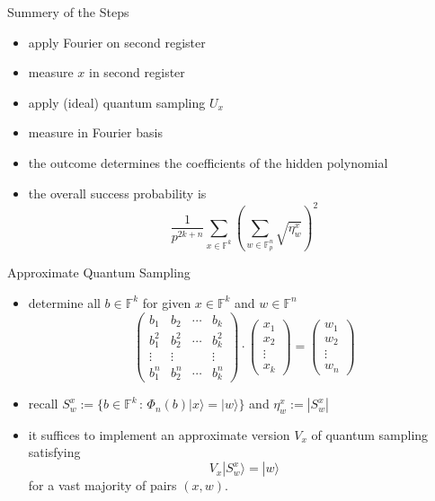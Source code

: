 \documentclass[slideColor]{prosper}
\newcommand{\F}{{\mathbb{F}}}
\renewcommand{\>}{\rangle}
\newcommand{\<}{\langle}
\begin{document}
\begin{slide}{Summery of the Steps}
\begin{itemize}
\item apply Fourier on second register
\item measure $x$ in second register
\item apply (ideal) quantum sampling $U_x$
\item measure in Fourier basis
\item the outcome determines the coefficients of the hidden polynomial
\item the overall success probability is
\[
\frac{1}{p^{2k+n}} \sum_{x\in\F^k} \left( \sum_{w \in \F_p^n} \sqrt{\eta_w^x}
\right)^2
\]
\end{itemize}
\end{slide}


\begin{slide}{Approximate Quantum Sampling}
\vspace{-0.2cm}
\begin{itemize}
\item determine all $b\in\F^k$ for given $x\in\F^k$ and $w\in\F^n$ 
\[
\left(
\begin{array}{cccc}
b_1 & b_2 & \cdots & b_k \\ b_1^2 & b_2^2 & \cdots & b_k^2 \\ \vdots &
\vdots & & \vdots \\ b_1^n & b_2^n & \cdots & b_k^n
\end{array}
\right)\cdot \left(
\begin{array}{c}
x_1 \\ x_2 \\ \vdots \\ x_k
\end{array}
\right) = \left(
\begin{array}{c}
w_1 \\ w_2 \\ \vdots \\ w_n
\end{array}
\right)
\]
\item recall $S_w^x := \{ b\in \F^k \,:\, \Phi_n(b)|x\> = |w\>\}$ and $\eta_w^x := |S_w^x|$
\item it suffices to implement an approximate version $V_x$ of quantum sampling satisfying
\[
V_x|S_w^x\>=|w\>
\]
for a vast majority of pairs $(x,w)$.
\end{itemize}
\end{slide}
\end{document}
